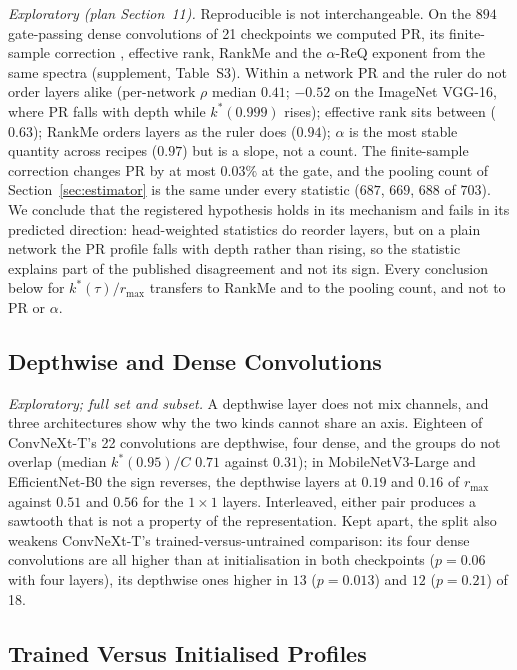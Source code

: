 \documentclass[10pt,journal,compsoc]{IEEEtran}
\begin{document}
\emph{Exploratory (plan Section~11).} Reproducible is not interchangeable.
On the $894$ gate-passing dense convolutions of 21 checkpoints we computed
PR, its finite-sample correction \cite{chun2026estimating}, effective
rank, RankMe \cite{garrido2023rankme} and the $\alpha$-ReQ exponent
\cite{agrawal2022alphaReq} from the same spectra (supplement, Table~S3).
Within a network PR and the ruler do not order layers alike (per-network
$\rho$ median $0.41$; $-0.52$ on the ImageNet VGG-16, where PR falls with
depth while $k^*(0.999)$ rises); effective rank sits between ($0.63$);
RankMe orders layers as the ruler does ($0.94$); $\alpha$ is the most
stable quantity across recipes ($0.97$) but is a slope, not a count. The
finite-sample correction changes PR by at most $0.03\%$ at the gate, and
the pooling count of Section~\ref{sec:estimator} is the same under every
statistic ($687$, $669$, $688$ of $703$). We conclude that the registered
hypothesis holds in its mechanism and fails in its predicted direction:
head-weighted statistics do reorder layers, but on a plain network the PR
profile falls with depth rather than rising, so the statistic explains
part of the published disagreement and not its sign. Every conclusion
below for $k^*(\tau)/r_{\max}$ transfers to RankMe and to the pooling
count, and not to PR or $\alpha$.

\subsection{Depthwise and Dense Convolutions}
\label{sec:dwsplit}

\emph{Exploratory; full set and subset.} A depthwise layer does not mix
channels, and three architectures show why the two kinds cannot share an
axis. Eighteen of ConvNeXt-T's 22 convolutions are depthwise, four dense,
and the groups do not overlap (median $k^*(0.95)/C$ $0.71$ against
$0.31$); in MobileNetV3-Large and EfficientNet-B0 the sign reverses, the
depthwise layers at $0.19$ and $0.16$ of $r_{\max}$ against $0.51$ and
$0.56$ for the $1\!\times\!1$ layers. Interleaved, either pair produces a
sawtooth that is not a property of the representation. Kept apart, the
split also weakens ConvNeXt-T's trained-versus-untrained comparison: its
four dense convolutions are all higher than at initialisation in both
checkpoints ($p = 0.06$ with four layers), its depthwise ones higher in
$13$ ($p = 0.013$) and $12$ ($p = 0.21$) of 18.

\subsection{Trained Versus Initialised Profiles}
\label{sec:learned}
\end{document}

